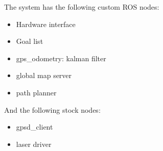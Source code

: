 The system has the following custom ROS nodes:
\begin{itemize}
   \item Hardware interface
   \item Goal list
   \item gps\_odometry: kalman filter
   \item global map server
   \item path planner
\end{itemize}
And the following stock nodes:
\begin{itemize}
   \item gpsd\_client
   \item laser driver
\end{itemize}


